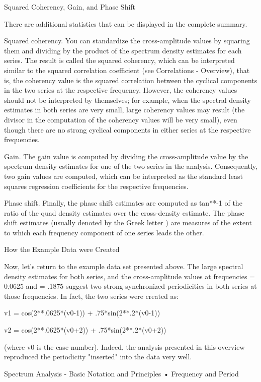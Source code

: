 Squared Coherency, Gain, and Phase Shift

There are additional statistics that can be displayed in the complete summary.

Squared coherency. You can standardize the cross-amplitude values by squaring them and dividing by the product of the spectrum density estimates for each series. The result is called the squared coherency, which can be interpreted similar to the squared correlation coefficient (see Correlations - Overview), that is, the coherency value is the squared correlation between the cyclical components in the two series at the respective frequency. However, the coherency values should not be interpreted by themselves; for example, when the spectral density estimates in both series are very small, large coherency values may result (the divisor in the computation of the coherency values will be very small), even though there are no strong cyclical components in either series at the respective frequencies.

Gain. The gain value is computed by dividing the cross-amplitude value by the spectrum density estimates for one of the two series in the analysis. Consequently, two gain values are computed, which can be interpreted as the standard least squares regression coefficients for the respective frequencies.

Phase shift. Finally, the phase shift estimates are computed as tan**-1 of the ratio of the quad density estimates over the cross-density estimate. The phase shift estimates (usually denoted by the Greek letter ) are measures of the extent to which each frequency component of one series leads the other.

How the Example Data were Created

Now, let's return to the example data set presented above. The large spectral density estimates for both series, and the cross-amplitude values at frequencies  = 0.0625 and  = .1875 suggest two strong synchronized periodicities in both series at those frequencies. In fact, the two series were created as:

v1 = cos(2**.0625*(v0-1)) + .75*sin(2**.2*(v0-1))

v2 = cos(2**.0625*(v0+2)) + .75*sin(2**.2*(v0+2))

(where v0 is the case number). Indeed, the analysis presented in this overview reproduced the periodicity "inserted" into the data very well.


Spectrum Analysis - Basic Notation and Principles
•
Frequency and Period

